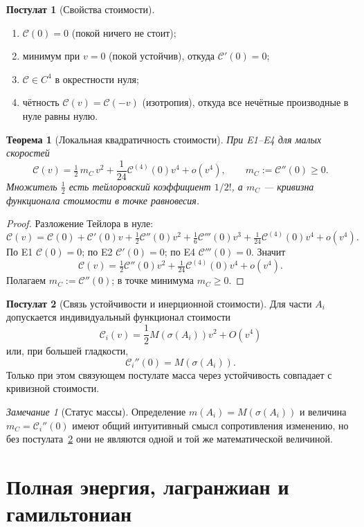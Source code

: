 \documentclass[12pt,a4paper,oneside]{book}
\theoremstyle{definition}
\newtheorem{postulate}{Постулат}[chapter]
\theoremstyle{plain}
\newtheorem{theorem}{Теорема}[chapter]
\theoremstyle{remark}
\newtheorem{remark}{Замечание}[chapter]
\newcommand{\Stab}{\sigma}
\newcommand{\Cost}{\mathcal C}
\begin{document}
\begin{postulate}[Свойства стоимости]\label{post:cost}
\begin{enumerate}
    \item[(E1)] $\Cost(0)=0$ (покой ничего не стоит);
    \item[(E2)] минимум при $v=0$ (покой устойчив), откуда $\Cost'(0)=0$;
    \item[(E3)] $\Cost\in C^4$ в окрестности нуля;
    \item[(E4)] чётность $\Cost(v)=\Cost(-v)$ (изотропия), откуда все нечётные
    производные в нуле равны нулю.
\end{enumerate}
\end{postulate}

\begin{theorem}[Локальная квадратичность стоимости]\label{thm:kinetic}
При E1--E4 для малых скоростей
\[
\Cost(v)=\tfrac12\,m_C\,v^2+\frac1{24}\Cost^{(4)}(0)v^4+o(v^4),
\qquad m_C:=\Cost''(0)\ge0.
\]
Множитель $\tfrac12$ есть тейлоровский коэффициент $1/2!$, а $m_C$ --- кривизна
функционала стоимости в точке равновесия.
\end{theorem}

\begin{proof}
Разложение Тейлора в нуле:
\[
\Cost(v)=\Cost(0)+\Cost'(0)v+\tfrac12\Cost''(0)v^2
+\tfrac16\Cost'''(0)v^3+\tfrac1{24}\Cost^{(4)}(0)v^4+o(v^4).
\]
По E1 $\Cost(0)=0$; по E2 $\Cost'(0)=0$; по E4 $\Cost'''(0)=0$. Значит
\[
\Cost(v)=\tfrac12\Cost''(0)v^2+\tfrac1{24}\Cost^{(4)}(0)v^4+o(v^4).
\]
Полагаем $m_C:=\Cost''(0)$; в точке минимума $m_C\ge0$.
\end{proof}

\begin{postulate}[Связь устойчивости и инерционной стоимости]\label{post:mass-bridge}
Для части $A_i$ допускается индивидуальный функционал стоимости
\[
\Cost_i(v)=\frac12 M(\Stab(A_i))v^2+O(v^4)
\]
или, при большей гладкости,
\[
\Cost_i''(0)=M(\Stab(A_i)).
\]
Только при этом связующем постулате масса через устойчивость совпадает с кривизной
стоимости.
\end{postulate}

\begin{remark}[Статус массы]
Определение $m(A_i)=M(\Stab(A_i))$ и величина $m_C=\Cost_i''(0)$ имеют общий
интуитивный смысл сопротивления изменению, но без постулата~\ref{post:mass-bridge}
они не являются одной и той же математической величиной.
\end{remark}

\section{Полная энергия, лагранжиан и гамильтониан}
\end{document}
